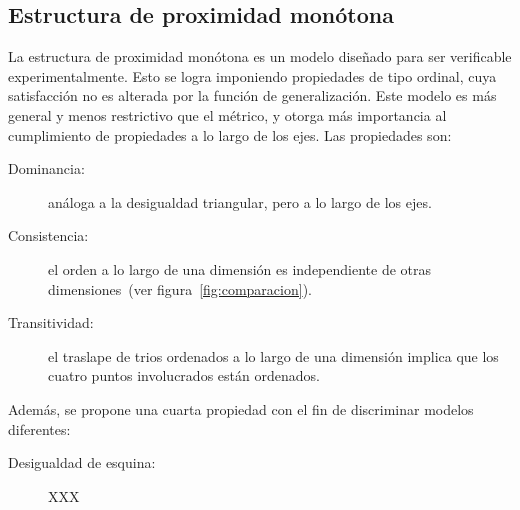 \documentclass[spanish]{article}
\begin{document}
\subsection{Estructura de proximidad monótona}
La estructura de proximidad monótona es un modelo diseñado para ser verificable experimentalmente.
Esto se logra imponiendo propiedades de tipo ordinal, cuya satisfacción no es alterada por la función de
generalización.  Este modelo es más general y menos restrictivo que el métrico, y otorga
más importancia al cumplimiento de propiedades a lo largo de los ejes.  Las propiedades son:
\begin{description}
    \item [Dominancia:]
        análoga a la desigualdad triangular, pero a lo largo de los ejes.
    \item [Consistencia:]
        el orden a lo largo de una dimensión es independiente de otras
        dimensiones~(ver figura~\ref{fig:comparacion}).
    \item [Transitividad:]
        el traslape de trios ordenados a lo largo de una dimensión implica
        que los cuatro puntos involucrados están ordenados.
\end{description}
Además, se propone una cuarta propiedad con el fin de discriminar modelos
diferentes:
\begin{description}
    \item [Desigualdad de esquina:] XXX
\end{description}
\end{document}
